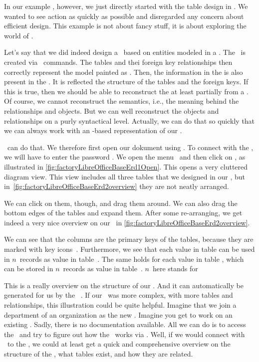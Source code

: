 In our example \db, however, we just directly started with the table design in \sql.
We wanted to see action as quickly as possible and disregarded any concern about efficient design.
This example is not about fancy stuff, it is about exploring the world of .

Let's say that we did indeed design a \db\ based on entities modeled in a .
The \db\ is created via \sql\ commands.
The tables and thei foreign key relationships then correctly represent the model painted as .
Then, the information in the  is also present in the \db.
It is reflected the structure of the tables and the foreign keys.
If this is true, then we should be able to reconstruct the  at least partially from a \db.
Of course, we cannot reconstruct the semantics, i.e., the meaning behind the relationships and objects.
But we can well reconstruct the objects and relationships on a purly syntactical level.
Actually, we can do that so quickly that we can always work with an -based representation of our \db.

\libreofficeBase\ can do that.
We therefore first open our dokument  using \libreofficeBase.
To connect with the \db, we will have to enter the password .
We open the menu~ and then click on , as illustrated in \cref{fig:factoryLibreOfficeBaseErd1Open}.
This opens a very cluttered diagram view.
This view includes all three tables that we designed in our \db, but in~\cref{fig:factoryLibreOfficeBaseErd2overview} they are not neatly arranged.

We can click on them, though, and drag them around.
We can also drag the bottom edges of the tables and expand them.
After some re-arranging, we get indeed a very nice overview on our \db\ in \cref{fig:factoryLibreOfficeBaseErd2overview}.

We can see that the  columns are the primary keys of the tables, because they are marked with key icons~\libreOfficeBaseKey.
Furthermore, we see that each  value in table  can be used in $n$~records as  value in table~.
The same holds for each  value in table , which can be stored in $n$~records as  value in table~.
$n$~here stands for 

This  is a really overview on the structure of our \db.
And it can automatically be generated for us by the \libreofficeBase\ .
If our \db\ was more complex, with more tables and relationships, this illustration could be quite helpful.
Imagine that we join a department of an organization as the new .
Imagine you get to work on an existing \db.
Sadly, there is no documentation available.
All we can do is to access the \dbms\ and try to figure out how the \db\ works via \sql.
Well, if we would connect with \libreofficeBase\ to the \dbms, we could at least get a quick and comprehensive overview on the structure of the \db, what tables exist, and how they are related.%
%
\FloatBarrier%
\endhsection%
%
